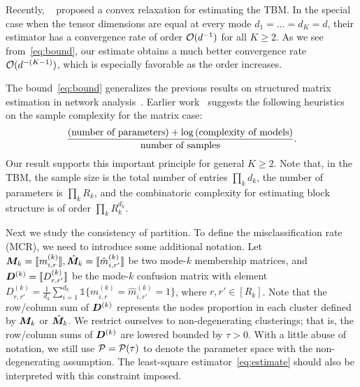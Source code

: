 \documentclass[11pt]{article}
\theoremstyle{plain}
\theoremstyle{definition}
\begin{document}
Recently, ~\cite{chi2018provable} proposed a convex relaxation for estimating the TBM. In the special case when the tensor dimensions are equal at every mode $d_1=\ldots=d_K=d$, their estimator has a convergence rate of order $\mathcal{O}(d^{-1})$ for all $K\geq 2$. As we see from~\eqref{eq:bound}, our estimate obtains a much better convergence rate $\mathcal{O}(d^{-(K-1)})$, which is especially favorable as the order increases. 


The bound~\eqref{eq:bound} generalizes the previous results on structured matrix estimation in network analysis~\cite{gao2016optimal,gao2018minimax}. %
Earlier work~\cite{gao2018minimax} suggests the following heuristics on the sample complexity for the matrix case:
\begin{equation} \label{eq:intuition}
{\text{(number of parameters)}+ \log \text{(complexity of models)}\over \text{number of samples}}.
\end{equation}
Our result supports this important principle for general $K\geq 2$. Note that, in the TBM, the sample size is the total number of entries $\prod_k d_k$, the number of parameters is $\prod_k R_k$, and the combinatoric complexity for estimating block structure is of order $\prod_k R_k^{d_k}$. 

Next we study the consistency of partition. To define the misclassification rate (MCR), we need to introduce some additional notation. Let $\bm M_k=\llbracket m^{(k)}_{i,r} \rrbracket, \hat{\bm M}_k=\llbracket \hat m^{(k)}_{i,r'} \rrbracket$ be two mode-$k$ membership matrices, and $\bm{D}^{(k)}=\llbracket D_{r,r'}^{(k)} \rrbracket$ be the mode-$k$ confusion matrix with element $D_{r,r'}^{(k)}=\frac{1}{d_k}\sum_{i=1}^{d_k}\mathds{1}\{m_{i,r}^{(k)}=\hat{m}_{i,r'}^{(k)}=1\}$, where $r,r'\in[R_k]$. Note that the row/column sum of $\bm{D}^{(k)}$ represents the nodes proportion in each cluster defined by $\bm M_k$ or $\hat{\bm M}_k$. We restrict ourselves to non-degenerating clusterings; that is, the row/column sums of $\bm{D}^{(k)}$ are lowered bounded by $\tau>0$. With a little abuse of notation, we still use $\mathcal{P}=\mathcal{P}(\tau)$ to denote the parameter space with the non-degenerating assumption. The least-square estimator~\eqref{eq:estimate} should also be interpreted with this constraint imposed. 
\end{document}
